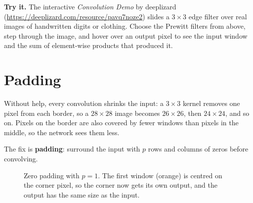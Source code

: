 \documentclass[12pt, a4paper]{article}
\begin{document}
\begin{notebox}
  \textbf{Try it.} The interactive \emph{Convolution Demo} by deeplizard
  (\url{https://deeplizard.com/resource/pavq7noze2}) slides a $3 \times 3$
  edge filter over real images of handwritten digits or clothing. Choose the
  Prewitt filters from above, step through the image, and hover over an
  output pixel to see the input window and the sum of element-wise products
  that produced it.
\end{notebox}

\section{Padding}

Without help, every convolution shrinks the input: a $3 \times 3$ kernel
removes one pixel from each border, so a $28 \times 28$ image becomes
$26 \times 26$, then $24 \times 24$, and so on. Pixels on the border are also
covered by fewer windows than pixels in the middle, so the network sees them
less.

The fix is \textbf{padding}: surround the input with $p$ rows and columns of
zeros before convolving.

\begin{figure}[H]
  \centering
  \caption{Zero padding with $p = 1$. The first window (orange) is centred on
    the corner pixel, so the corner now gets its own output, and the output
    has the same size as the input.}
  \label{fig:padding}
\end{figure}
\end{document}
